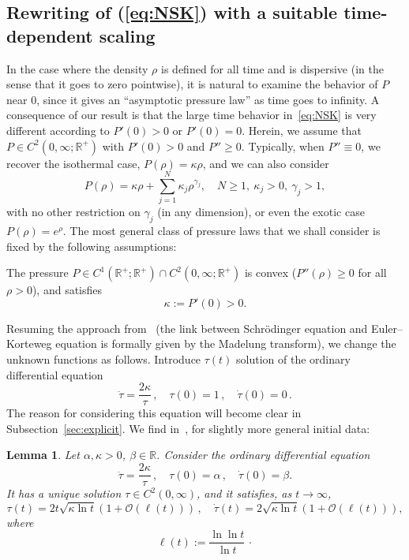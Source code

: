 \documentclass[10pt]{amsart}
\newtheorem{lemm}[theo]{Lemma}\newtheorem{prop}[theo]{Proposition}\newtheorem{coro}[theo]{Corollary}\newtheorem{conj}[theo]{Conjecture}
\theoremstyle{definition}\newtheorem{defi}[theo]{Definition}\newtheorem{rema}[theo]{Remark}\newtheorem{exam}[theo]{Example}\newtheorem{exem}[theo]{Example}\newtheorem{nota}[theo]{Notation}
\newcommand*\R{\mathbb{R}}
\newcommand*\calO{\mathcal{O}}
\newcommand*\<{\left\langle}
\renewcommand*\>{\right\rangle}
\renewcommand*\ge{\geqslant}
\begin{document}
\subsection{Rewriting of (\ref{eq:NSK}) with a suitable time-dependent scaling}\label{sec:large-time}

In the case where the density $\rho$ is defined for all time and is dispersive (in the sense that it goes to zero pointwise), it is natural to examine the behavior of $P$ near $0$, since it gives an ``asymptotic pressure law'' as time goes to infinity. A consequence of our result is that the large time behavior in~\eqref{eq:NSK} is very different according to $P'(0)>0$ or $P'(0)=0$. Herein, we assume that $P\in C^2(0,\infty;\R^+)$ with $P'(0)>0$ and $P''\ge 0$. Typically, when $P''\equiv 0$, we recover the isothermal case, $P(\rho)=\kappa\rho$, and we can also consider
\begin{equation*}
P(\rho)=\kappa \rho +\sum_{j=1}^N
\kappa_j\rho^{\gamma_j},\quad N\ge 1,\ \kappa_j>0,\ \gamma_j>1,
\end{equation*}
with no other restriction on $\gamma_j$ (in any dimension), or even the exotic case $P(\rho)=e^\rho$. The most general class of pressure laws that we shall consider is fixed by the following assumptions:

\begin{hyp}\label{hyp:P-temps-long}
The pressure $P\in C^1(\R^+;\R^+)\cap C^2(0,\infty;\R^+)$ is convex ($P''(\rho)\ge 0$ for all $\rho> 0$), and satisfies
\[
\kappa:=P'(0)>0.
\]
\end{hyp}

Resuming the approach from~\cite{CaGa18} (the link between Schr\"odinger equation and Euler--Korteweg equation is formally given by the Madelung transform), we change the unknown functions as follows. Introduce $\tau(t)$ solution of the ordinary differential equation
\begin{equation}\label{eq:tau}
\ddot \tau = \frac{2\kappa }{\tau} \,,\quad \tau(0)=1\,,\quad \dot
\tau(0)=0\,.
\end{equation}
The reason for considering this equation will become clear in Subsection~\ref{sec:explicit}. We find in~\cite{CaGa18}, for slightly more general initial data:

\begin{lemm}\label{lem:taubis}
Let $\alpha,\kappa>0$, $\beta\in \R$. Consider the ordinary differential equation
\begin{equation}\label{eq:taugen}
\ddot \tau = \frac{2\kappa }{\tau} \,,\quad \tau(0)=\alpha\,,\quad \dot
\tau(0)=\beta.
\end{equation}
It has a unique solution $\tau\in C^2(0,\infty)$, and it satisfies, as $t\to \infty$,
\begin{equation*}
\tau(t)= 2t \sqrt{\kappa \ln t}\left(1+\calO(\ell(t))\right) \,,\quad \dot
\tau(t)=2\sqrt{\kappa\ln t}\left(1+\calO(\ell(t))\right),
\end{equation*}
where
\begin{equation*}
\ell (t):= \frac{\ln \ln t}{ \ln t} \, \cdotp
\end{equation*}
\end{lemm}
\end{document}
